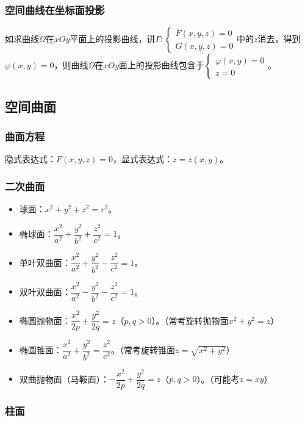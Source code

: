 \documentclass[UTF8, 12pt]{ctexart}
\begin{document}
\subsubsection{空间曲线在坐标面投影}

如求曲线$\varOmega$在$xOy$平面上的投影曲线，讲$\varGamma:\left\{\begin{array}{l}
    F(x,y,z)=0 \\
        G(x,y,z)=0
\end{array}\right.$中的$z$消去，得到$\varphi(x,y)=0$，则曲线$\varOmega$在$xOy$面上的投影曲线包含于$\left\{\begin{array}{l}
    \varphi(x,y)=0 \\
    z=0
\end{array}\right.$。

\subsection{空间曲面}

\subsubsection{曲面方程}

隐式表达式：$F(x,y,z)=0$，显式表达式：$z=z(x,y)$。

\subsubsection{二次曲面}

\begin{itemize}
    \item 球面：$x^2+y^2+z^2=r^2$。
    \item 椭球面：$\dfrac{x^2}{a^2}+\dfrac{y^2}{b^2}+\dfrac{z^2}{c^2}=1$。
    \item 单叶双曲面：$\dfrac{x^2}{a^2}+\dfrac{y^2}{b^2}-\dfrac{z^2}{c^2}=1$。
    \item 双叶双曲面：$\dfrac{x^2}{a^2}-\dfrac{y^2}{b^2}-\dfrac{z^2}{c^2}=1$。
    \item 椭圆抛物面：$\dfrac{x^2}{2p}+\dfrac{y^2}{2q}=z$（$p,q>0$）。（常考旋转抛物面$x^2+y^2=z$）
    \item 椭圆锥面：$\dfrac{x^2}{a^2}+\dfrac{y^2}{b^2}=\dfrac{z^2}{c^2}$。（常考旋转锥面$z=\sqrt{x^2+y^2}$）
    \item 双曲抛物面（马鞍面）：$-\dfrac{x^2}{2p}+\dfrac{y^2}{2q}=z$（$p,q>0$）。（可能考$z=xy$）
\end{itemize}

\subsubsection{柱面}
\end{document}
